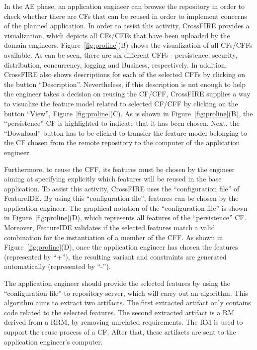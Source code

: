 In the AE phase, an application engineer can browse the repository in order to check whether there are CFs that can be reused in order to implement concerns of the planned application. In order to assist this activity, CrossFIRE provides a visualization, which depicts all CFs/CFFs that have been uploaded by the domain engineers.
Figure~\ref{fig:proline}(B) shows the visualization of all CFs/CFFs available.
As can be seen, there are six different CFFs - persistence, security, distribution, concurrency, logging and 	Business, respectively. 
In addition, CrossFIRE also shows descriptions for each of the selected CFFs by clicking on the button ``Description''. 
Nevertheless, if this description is not enough to help the engineer takes a decision on reusing the CF/CFF, CrossFIRE supplies a way to visualize the feature model related to selected CF/CFF by clicking on the button ``View'', Figure~\ref{fig:proline}(C). 
As is shown in Figure~\ref{fig:proline}(B), the ``persistence'' CF is highlighted to indicate that it has been chosen. 
Next, the ``Download'' button has to be clicked to transfer the feature model belonging to the CF chosen from the remote repository to the computer of the application engineer.

Furthermore, to reuse the CFF, its features must be chosen by the engineer aiming at specifying explicitly which features will be reused in the base application. %
To assist this activity, CrossFIRE uses the ``configuration file'' of FeatureIDE. By using this ``configuration file'', features can be chosen by the application engineer. The graphical notation of the ``configuration file'' is shown in Figure~\ref{fig:proline}(D), which represents all features of the ``persistence'' CF. Moreover, FeatureIDE validates if the selected features match a valid combination for the instantiation of a member of the CFF. As shown in Figure~\ref{fig:proline}(D), once the application engineer has chosen the features (represented by ``+''), the resulting variant and constraints are generated automatically (represented by ``-''). 


The application engineer should provide  the selected features by using the ``configuration file'' to repository server, which will carry out an algorithm. This algorithm aims to extract two artifacts. The first extracted artifact only contains code related to the selected features. The second extracted artifact is a RM derived from a RRM, by removing unrelated requirements. The RM is used to support the reuse process of a CF. After that, these artifacts are sent to the application engineer's computer. %


